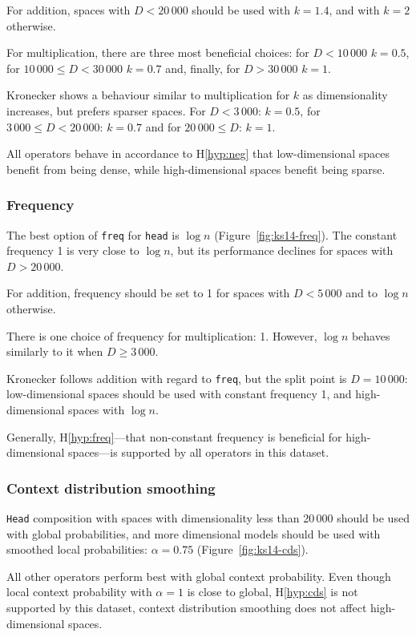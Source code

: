 For addition, spaces with $D < 20\,000$ should be used with $k = 1.4$, and with $k = 2$ otherwise.

For multiplication, there are three most beneficial choices: for $D < 10\,000$ $k = 0.5$, for $10\,000 \leq D < 30\,000$ $k = 0.7$ and, finally, for $D > 30\,000$ $k = 1$.

Kronecker shows a behaviour  similar to multiplication for $k$ as dimensionality increases, but prefers sparser spaces. For $D < 3\,000$: $k = 0.5$, for $3\,000 \leq D < 20\,000$: $k = 0.7$ and for $20\,000 \leq D$: $k = 1$.

All operators behave in accordance to H\ref{hyp:neg} that low-dimensional spaces benefit from being dense, while high-dimensional spaces benefit being sparse.

\subsubsection{Frequency}
The best option of \texttt{freq} for \texttt{head} is $\log n$ (Figure~\ref{fig:ks14-freq}). The constant frequency 1 is very close to $\log n$, but its performance declines for spaces with $D > 20\,000$.

For addition, frequency should be set to 1 for spaces with $D < 5\,000$ and to $\log n$ otherwise.

There is one choice of frequency for multiplication: 1. However, $\log n$ behaves similarly to it when $D \geq 3\,000$.

Kronecker follows addition with regard to \texttt{freq}, but the split point is $D = 10\,000$: low-dimensional spaces should be used with constant frequency 1, and high-dimensional spaces with $\log n$.

Generally, H\ref{hyp:freq}---that non-constant frequency is beneficial for high-dimensional spaces---is supported by all operators in this dataset.

\subsubsection{Context distribution smoothing}


\texttt{Head} composition with spaces with dimensionality less than 20\,000 should be used with global probabilities, and more dimensional models should be used with smoothed local probabilities: $\alpha = 0.75$ (Figure~\ref{fig:ks14-cds}).

All other operators perform best with global context probability. Even though local context probability with $\alpha = 1$ is close to global, H\ref{hyp:cds} is not supported by this dataset, context distribution smoothing does not affect high-dimensional spaces.

